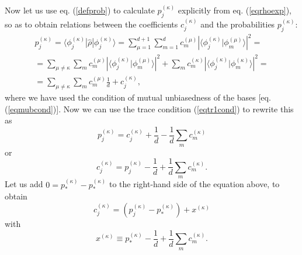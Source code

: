 \documentclass[aps,twocolumn,showpacs,nofootinbib,superscriptaddress]{revtex4}
\newcommand{\ket}[1]{|{#1}\rangle}
\newcommand{\bra}[1]{\langle{#1}|}
\begin{document}
Now let us use eq. (\ref{defprob}) to calculate $p_{j}^{(\kappa)}$
explicitly from eq. (\ref{eqrhoexp}), so as to obtain relations
between the coefficients $c_{j}^{(\kappa)}$ and the probabilities
$p_{j}^{(\kappa)}$:
\begin{eqnarray}
p_{j}^{(\kappa)}=\bra{\phi_{j}^{(\kappa)}} \hat{\rho} \ket{\phi_{j}^{(\kappa)}} = \sum_{\mu=1}^{d+1} \sum_{m=1}^d c_{m}^{(\mu)}\left| \langle\phi_{j}^{(\kappa)}|\phi_{m}^{(\mu)}\rangle\right|^2=\nonumber\\
=\sum_{\mu\neq \kappa} \sum_{m}c_{m}^{(\mu)}\left| \langle\phi_{j}^{(\kappa)}|\phi_{m}^{(\mu)}\rangle\right|^2 + \sum_{m}c_{m}^{(\kappa)} \left| \langle\phi_{j}^{(\kappa)}|\phi_{m}^{(\kappa)}\rangle\right|^2=\nonumber\\
=\sum_{\mu\neq \kappa}\sum_{m}c_{m}^{(\mu)}\frac{1}{d}+c_{j}^{(\kappa)},\quad \quad
\end{eqnarray}
where we have used the condition of mutual unbiasedness of the
bases [eq. (\ref{eqmubcond})]. Now we can use the trace condition
(\ref{eqtr1cond}) to rewrite this as
\begin{equation}
p_{j}^{(\kappa)}=c_{j}^{(\kappa)}+\frac{1}{d}-\frac{1}{d}\sum_{m}c_{m}^{(\kappa)}
\end{equation}
or
\begin{equation}
c_{j}^{(\kappa)}=p_{j}^{(\kappa)}-\frac{1}{d}+\frac{1}{d}\sum_{m}c_{m}^{(\kappa)}.
\end{equation}
Let us add $0=p_{*}^{(\kappa)}-p_{*}^{(\kappa)}$ to the right-hand side of the
equation above, to obtain
\begin{equation}
c_{j}^{(\kappa)}=\left(
p_{j}^{(\kappa)}-p_{*}^{(\kappa)}\right)+x^{(\kappa)}
\label{eqcfinal}
\end{equation}
with
\begin{equation}
x^{(\kappa)}\equiv
p_{*}^{(\kappa)}-\frac{1}{d}+\frac{1}{d}\sum_{m}c_{m}^{(\kappa)}.
\end{equation}
\end{document}
